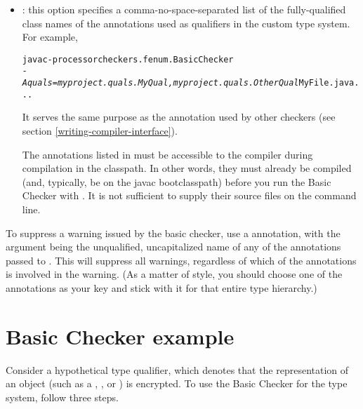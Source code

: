 \begin{itemize}

\item
{}: this option specifies a comma-no-space-separated list of
the fully-qualified class
names of the annotations used as qualifiers in the custom type system.  For
example,

\begin{alltt}
  javac -processor checkers.fenum.BasicChecker
        \textit{-Aquals=myproject.quals.MyQual,myproject.quals.OtherQual} MyFile.java ...
\end{alltt}

It serves the same purpose as the 
annotation used by other checkers (see section
\ref{writing-compiler-interface}).

The annotations listed in  must be accessible to
the compiler during compilation in the classpath.  In other words, they must
already be compiled (and, typically, be on the javac bootclasspath)
before you run the Basic Checker with .  It
is not sufficient to supply their source files on the command line.

\end{itemize}

To suppress a warning issued by the basic checker, use a 
annotation, with the argument being the unqualified, uncapitalized name of
any of the annotations passed to .  This will suppress all
warnings, regardless of which of the annotations is involved in the
warning.  (As a matter of style, you should choose one of the annotations
as your  key and stick with it for that entire type
hierarchy.)


\section{Basic Checker example\label{basic-example}\label{encrypted-example}}

Consider a hypothetical  type qualifier, which denotes that the
representation of an object (such as a , , or
) is encrypted. To use the Basic Checker for the 
type system, follow three steps.

